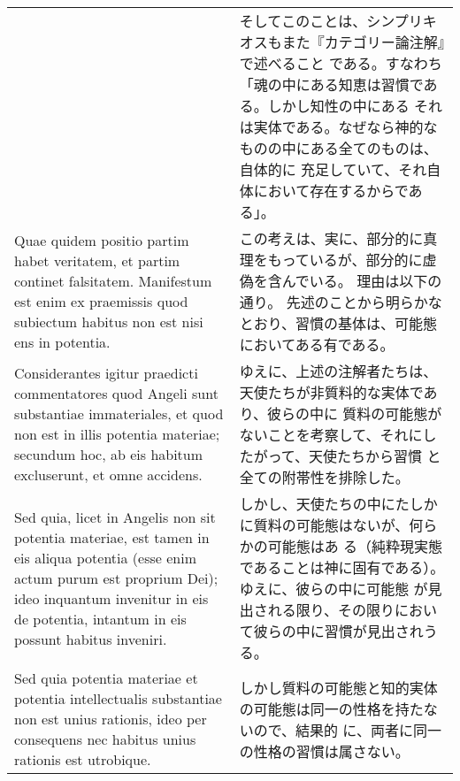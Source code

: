 \documentclass[10pt]{jsarticle} %
\begin{document}
\begin{longtable}{p{21em}p{21em}}
&

そしてこのことは、シンプリキオスもまた『カテゴリー論注解』で述べること
 である。すなわち「魂の中にある知恵は習慣である。しかし知性の中にある
 それは実体である。なぜなら神的なものの中にある全てのものは、自体的に
 充足していて、それ自体において存在するからである」。


\\



Quae quidem positio
 partim habet veritatem, et partim continet falsitatem. Manifestum est
 enim ex praemissis quod subiectum habitus non est nisi ens in
 potentia. 


&

この考えは、実に、部分的に真理をもっているが、部分的に虚偽を含んでいる。
 理由は以下の通り。
先述のことから明らかなとおり、習慣の基体は、可能態においてある有である。

\\


Considerantes igitur praedicti commentatores quod Angeli
 sunt substantiae immateriales, et quod non est in illis potentia
 materiae; secundum hoc, ab eis habitum excluserunt, et omne
 accidens. 

&

ゆえに、上述の注解者たちは、天使たちが非質料的な実体であり、彼らの中に
 質料の可能態がないことを考察して、それにしたがって、天使たちから習慣
 と全ての附帯性を排除した。

\\


Sed quia, licet in Angelis non sit potentia materiae, est
 tamen in eis aliqua potentia (esse enim actum purum est proprium
 Dei); ideo inquantum invenitur in eis de potentia, intantum in eis
 possunt habitus inveniri. 

&

しかし、天使たちの中にたしかに質料の可能態はないが、何らかの可能態はあ
 る（純粋現実態であることは神に固有である）。ゆえに、彼らの中に可能態
 が見出される限り、その限りにおいて彼らの中に習慣が見出されうる。

\\


Sed quia potentia materiae et potentia
 intellectualis substantiae non est unius rationis, ideo per
 consequens nec habitus unius rationis est utrobique. 

&

しかし質料の可能態と知的実体の可能態は同一の性格を持たないので、結果的
 に、両者に同一の性格の習慣は属さない。


\end{longtable}
\end{document}
